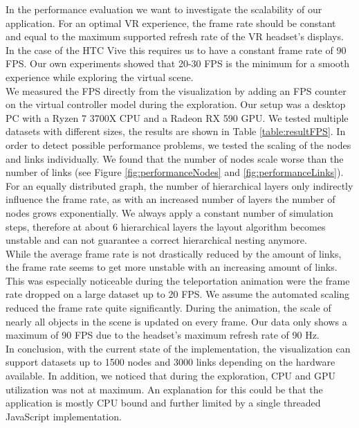 In the performance evaluation we want to investigate the scalability of our application. 
For an optimal VR experience, the frame rate should be constant and equal to the maximum supported refresh rate of the VR headset's displays. In the case of the HTC Vive this requires us to have a constant frame rate of 90 FPS.
Our own experiments showed that 20-30 FPS is the minimum for a smooth experience while exploring the virtual scene.
\\
We measured the FPS directly from the visualization by adding an FPS counter on the virtual controller model during the exploration. Our setup was a desktop PC with a Ryzen 7 3700X CPU and a Radeon RX 590 GPU. 
We tested multiple datasets with different sizes, the results are shown in Table \ref{table:resultFPS}. 
In order to detect possible performance problems, we tested the scaling of the nodes and links individually.
We found that the number of nodes scale worse than the number of links (see Figure \ref{fig:performanceNodes} and \ref{fig:performanceLinks}). 
For an equally distributed graph, the number of hierarchical layers only indirectly influence the frame rate, as with an increased number of layers the number of nodes grows exponentially.
We always apply a constant number of simulation steps, therefore at about 6 hierarchical layers the layout algorithm becomes unstable and can not guarantee a correct hierarchical nesting anymore.
\\
While the average frame rate is not drastically reduced by the amount of links, the frame rate seems to get more unstable with an increasing amount of links. 
This was especially noticeable during the teleportation animation were the frame rate dropped on a large dataset up to 20 FPS. 
We assume the automated scaling reduced the frame rate quite significantly. During the animation, the scale of nearly all objects in the scene is updated on every frame.
Our data only shows a maximum of 90 FPS due to the headset's maximum refresh rate of 90 Hz.
\\
In conclusion, with the current state of the implementation, the visualization can support datasets up to 1500 nodes and 3000 links depending on the hardware available.
In addition, we noticed that during the exploration, CPU and GPU utilization was not at maximum. An explanation for this could be that the application is mostly CPU bound and further limited by a single threaded JavaScript implementation.

